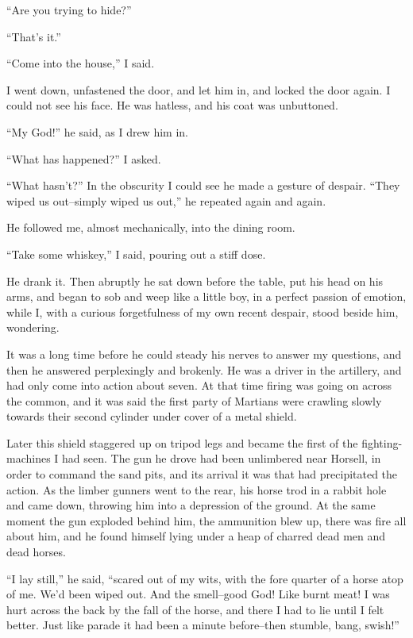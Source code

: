 ``Are you trying to hide?''

``That's it.''

``Come into the house,'' I said.

I went down, unfastened the door, and let him in, and locked the
door again. I could not see his face. He was hatless, and his coat
was unbuttoned.

``My God!'' he said, as I drew him in.

``What has happened?'' I asked.

``What hasn't?'' In the obscurity I could see he made a gesture of
despair. ``They wiped us out--simply wiped us out,'' he repeated
again and again.

He followed me, almost mechanically, into the dining room.

``Take some whiskey,'' I said, pouring out a stiff dose.

He drank it. Then abruptly he sat down before the table, put his
head on his arms, and began to sob and weep like a little boy, in a
perfect passion of emotion, while I, with a curious forgetfulness
of my own recent despair, stood beside him, wondering.

It was a long time before he could steady his nerves to answer my
questions, and then he answered perplexingly and brokenly. He was a
driver in the artillery, and had only come into action about seven.
At that time firing was going on across the common, and it was said
the first party of Martians were crawling slowly towards their
second cylinder under cover of a metal shield.

Later this shield staggered up on tripod legs and became the first
of the fighting-machines I had seen. The gun he drove had been
unlimbered near Horsell, in order to command the sand pits, and its
arrival it was that had precipitated the action. As the limber
gunners went to the rear, his horse trod in a rabbit hole and came
down, throwing him into a depression of the ground. At the same
moment the gun exploded behind him, the ammunition blew up, there
was fire all about him, and he found himself lying under a heap of
charred dead men and dead horses.

``I lay still,'' he said, ``scared out of my wits, with the fore
quarter of a horse atop of me. We'd been wiped out. And the
smell--good God! Like burnt meat! I was hurt across the back by the
fall of the horse, and there I had to lie until I felt better. Just
like parade it had been a minute before--then stumble, bang,
swish!''

